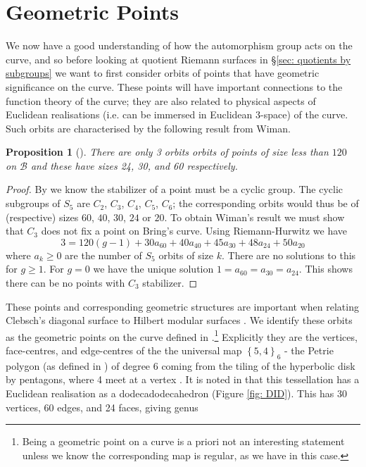 \documentclass{amsart}
\newtheorem{prop}[theorem]{Proposition}
\newcommand{\pbrace}[1]{\left\{ #1 \right\} }
\begin{document}
\section{Geometric Points}\label{sec: geometric points}
We now have a good understanding of how the automorphism group acts on the curve, and so before looking at quotient Riemann surfaces in \S\ref{sec: quotients by subgroups} we want to first consider orbits of points that have geometric significance on the curve. These points will have important connections to the function theory of the curve; they are also related to physical aspects of Euclidean realisations (i.e. can be immersed in Euclidean 3-space) of the curve. Such orbits are characterised by the following result from Wiman.
\begin{prop}[\cite{Wiman1895}]
There are only 3 orbits orbits of points of size less than $120$ on $\mathcal{B}$ and these have sizes 24, 30, and 60 respectively.
\end{prop}
\begin{proof}
By \cite[III.7.7]{Farkas1992} we know the stabilizer of a point must be a cyclic group. The cyclic subgroups of $S_5$ are $C_2$, $C_3$, $C_4$, $C_5$, $C_6$; the corresponding orbits would thus be of (respective) sizes $60$, $40$, $30$, $24$ or $20$. To obtain Wiman's result we must show that $C_3$ does not fix a point on Bring's curve. Using Riemann-Hurwitz we have
$$
3=120(g-1)+30 a_{60}+40 a_{40}+45 a_{30}+48 a_{24}
+50 a_{20}
$$
where $a_k\ge0$ are the number of $S_5$ orbits of size
$k$. There are no solutions to this for $g\ge1$. For $g=0$ we have the unique solution $1=a_{60}=a_{30}=a_{24}$. This shows there can be no points with $C_3$ stabilizer.
\end{proof}
These points and corresponding geometric structures are important when relating Clebsch's diagonal surface to Hilbert modular surfaces \cite{Hirzebruch1976, Bell2004}. We identify these orbits as the geometric points on the curve defined in \cite{Singerman1997}.\footnote{Being a geometric point on a curve is a priori not an interesting statement unless we know the corresponding map is regular, as we have in this case.} Explicitly they are the vertices, face-centres, and edge-centres of the the universal map $\pbrace{5,4}_6$ - the Petrie polygon (as defined in \cite[\S 8.6]{Coxeter1980}) of degree 6 coming from the tiling of the hyperbolic disk by pentagons, where 4 meet at a vertex \cite{Singerman1988}. It is noted in \cite{Weber2005} that this tessellation has a Euclidean realisation as a dodecadodecahedron (Figure \ref{fig: DID}). This has 30 vertices, 60 edges, and 24 faces, giving genus 
\end{document}
